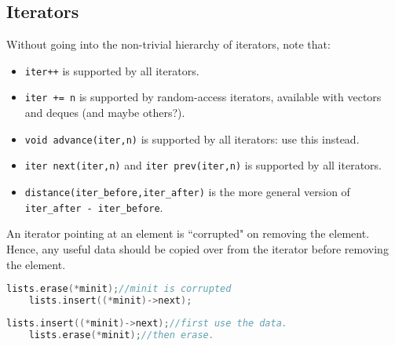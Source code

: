 \documentclass{article}
\begin{document}
\subsection{Iterators}
Without going into the non-trivial hierarchy of iterators, note that:
\begin{itemize}
    \item \texttt{iter++} is supported by all iterators.
    \item \texttt{iter += n} is supported by random-access iterators, available with vectors and deques (and maybe others?).
    \item \texttt{void advance(iter,n)} is supported by all iterators: use this instead.
    \item \texttt{iter next(iter,n)} and \texttt{iter prev(iter,n)} is supported by all iterators.
    \item \texttt{distance(iter\_before,iter\_after)} is the more general version of \texttt{iter\_after - iter\_before}.
\end{itemize}
An iterator pointing at an element is ``corrupted" on removing the element.
Hence, any useful data should be copied over from the iterator before removing the element.
\begin{lstlisting}[caption={Undefined behaviour},language=C++]
    lists.erase(*minit);//minit is corrupted
    lists.insert((*minit)->next);
\end{lstlisting}
\begin{lstlisting}[caption={Working code},language=C++]
    lists.insert((*minit)->next);//first use the data.
    lists.erase(*minit);//then erase.
\end{lstlisting}
\end{document}
